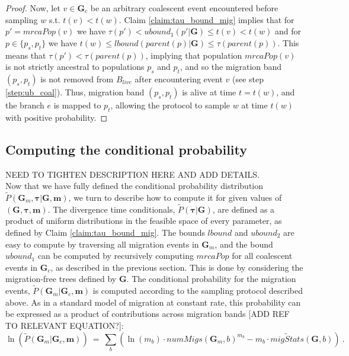 \documentclass[11pt]{article}
\newcommand{\vect}[1]{\boldsymbol{\mathbf{#1}}}
\newcommand{\G}{\vect{G}}
\newcommand{\Pref}{\widetilde{P}}
\newcommand{\1}{\mathbbm{1}}
\newcommand{\Gc}{\G_c}
\newcommand{\Gm}{\G_m}
\newcommand{\taus}{\vect\tau}
\newcommand{\migs}{\vect{m}}
\begin{document}
\begin{proof}
 Now, let $v\in\Gc$ be an arbitrary coalescent event encountered before sampling $w$ s.t. $t(v)<t(w)$.
 Claim \ref{claim:tau_bound_mig} implies that for $p'=mrcaPop(v)$ we have $\tau(p')<ubound_1(p'|\G) \leq t(v)<t(w)$ and
 for $p\in\{p_s,p_t\}$ we have $t(w)\leq lbound(parent(p)|\G) \leq \tau(parent(p))$.
 This means that $\tau(p')<\tau(parent(p))$, implying that population $mrcaPop(v)$ is not strictly ancestral to populations $p_s$ and $p_t$,
 and so the migration band $(p_s,p_t)$ is not removed from $B_{live}$ after encountering event $v$ (see step \ref{step:ub_coal}).
 Thus, migration band $(p_s,p_t)$ is alive at time $t=t(w)$, and the branch $e$ is mapped to $p_t$,
 allowing the protocol to sample $w$ at time $t(w)$ with positive probability.
 \end{proof}

\subsection*{Computing the conditional probability}

NEED TO TIGHTEN DESCRIPTION HERE AND ADD DETAILS.\\

Now that we have fully defined the conditional probability distribution $\Pref(\Gm,\taus|\G,\migs)$, we turn to describe how to compute it for given values of $(\G,\taus,\migs)$.
The divergence time conditionals, $\Pref(\taus|\G)$, are defined as a product of uniform distributions in the feasible space of every parameter, as defined by Claim \ref{claim:tau_bound_mig}.
The bounds $lbound$ and $ubound_2$ are easy to compute by traversing all migration events in $\Gm$, and the bound $ubound_1$ can be computed by recursively computing $mrcaPop$ for all coalescent
events in $\Gc$, as described in the previous section. This is done by considering the migration-free trees defined by $\G$.
%
The conditional probability for the migration events, $\Pref(\Gm|\Gc,\migs)$ is computed according to the sampling protocol described above.
%
As in a standard model of migration at constant rate, this probability can be expressed as a product of contributions across migration bands [ADD REF TO RELEVANT EQUATION?]:
\begin{equation}\label{eq:pref-m}
 \ln \left( \Pref(\Gm|\Gc,\migs) \right) ~=~ \sum_b \left( \ln( m_b) \cdot numMigs(\Gm,b)^{m_b} -m_b \cdot \widetilde{migStats}(\G,b) \right) ~.
\end{equation}
\end{document}
